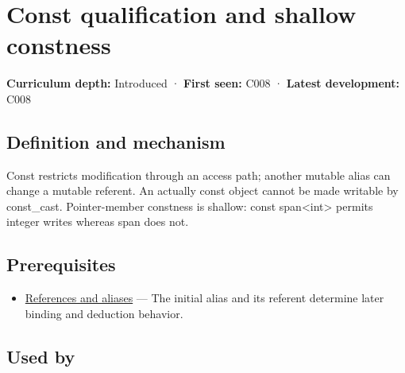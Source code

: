 \hypertarget{appendix-c25d60fed375}{}\label{referencestart:appendix-c25d60fed375}
\section{Const qualification and shallow constness}\label{appendix-c25d60fed375-const-qualification-and-shallow-constness}

\hypertarget{appendix-c25d60fed375-const-qualification-and-shallow-constness}{}

\textbf{Curriculum depth:} Introduced · \textbf{First seen:} C008 · \textbf{Latest development:} C008

\begin{allmightroledefinition}

\subsection{Definition and mechanism}\label{appendix-c25d60fed375-definition-and-mechanism}

\hypertarget{appendix-c25d60fed375-definition-and-mechanism}{}

Const restricts modification through an access path; another mutable alias can change a mutable referent. An actually const object cannot be made writable by const\_cast. Pointer-member constness is shallow: const span\textless int\textgreater{} permits integer writes whereas span does not.

\end{allmightroledefinition}

\subsection{Prerequisites}\label{appendix-c25d60fed375-prerequisites}

\hypertarget{appendix-c25d60fed375-prerequisites}{}

\begin{itemize}
\tightlist
\item
  \hyperref[appendix-d6d562ca9fbb]{References and aliases} --- The initial alias and its referent determine later binding and deduction behavior.
\end{itemize}

\subsection{Used by}\label{appendix-c25d60fed375-used-by}

\hypertarget{appendix-c25d60fed375-used-by}{}

